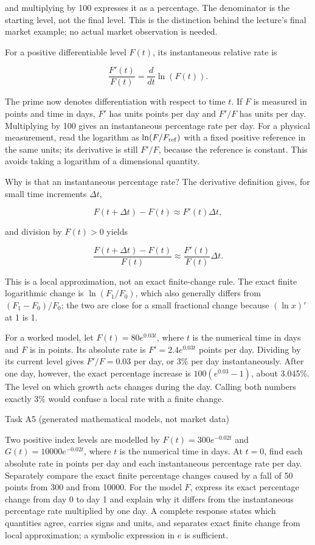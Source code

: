 \documentclass[
  11pt,
]{article}
\providecommand{\gt}{>}
\begin{document}
and multiplying by 100 expresses it as a percentage. The denominator is
the starting level, not the final level. This is the distinction behind
the lecture's final market example; no actual market observation is
needed.

For a positive differentiable level \(F(t)\), its instantaneous relative
rate is

\[
\frac{F'(t)}{F(t)}=\frac{d}{dt}\ln(F(t)).
\]

The prime now denotes differentiation with respect to time \(t\). If
\(F\) is measured in points and time in days, \(F'\) has units points
per day and \(F'/F\) has units per day. Multiplying by 100 gives an
instantaneous percentage rate per day. For a physical measurement, read
the logarithm as \(\ln(F/F_{\rm ref})\) with a fixed positive reference
in the same units; its derivative is still \(F'/F\), because the
reference is constant. This avoids taking a logarithm of a dimensional
quantity.

Why is that an instantaneous percentage rate? The derivative definition
gives, for small time increments \(\Delta t\),

\[
F(t+\Delta t)-F(t)\approx F'(t)\Delta t,
\]

and division by \(F(t)\gt 0\) yields

\[
\frac{F(t+\Delta t)-F(t)}{F(t)}
\approx\frac{F'(t)}{F(t)}\Delta t.
\]

This is a local approximation, not an exact finite-change rule. The
exact finite logarithmic change is \(\ln(F_1/F_0)\), which also
generally differs from \((F_1-F_0)/F_0\); the two are close for a small
fractional change because \((\ln x)'\) at 1 is 1.

For a worked model, let \(F(t)=80e^{0.03t}\), where \(t\) is the
numerical time in days and \(F\) is in points. Its absolute rate is
\(F'=2.4e^{0.03t}\) points per day. Dividing by its current level gives
\(F'/F=0.03\) per day, or 3\% per day instantaneously. After one day,
however, the exact percentage increase is \(100(e^{0.03}-1)\), about
3.045\%. The level on which growth acts changes during the day. Calling
both numbers exactly 3\% would confuse a local rate with a finite
change.

Task A5 (generated mathematical models, not market data)

Two positive index levels are modelled by \(F(t)=300e^{-0.02t}\) and
\(G(t)=10000e^{-0.02t}\), where \(t\) is the numerical time in days. At
\(t=0\), find each absolute rate in points per day and each
instantaneous percentage rate per day. Separately compare the exact
finite percentage changes caused by a fall of 50 points from 300 and
from 10000. For the model \(F\), express its exact percentage change
from day 0 to day 1 and explain why it differs from the instantaneous
percentage rate multiplied by one day. A complete response states which
quantities agree, carries signs and units, and separates exact finite
change from local approximation; a symbolic expression in \(e\) is
sufficient.
\end{document}
